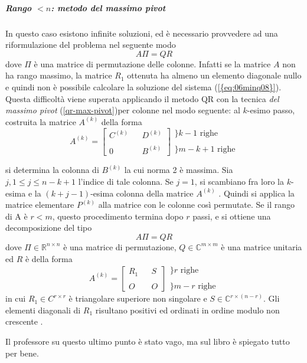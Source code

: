 \subparagraph{Rango $<n$: metodo del massimo pivot} 
In questo caso esistono infinite soluzioni, ed \`e necessario
provvedere ad una riformulazione del problema nel seguente modo
$$ A\Pi = QR$$ 
dove $\Pi$ \`e una matrice di permutazione delle colonne.  Infatti se
la matrice $A$ non ha rango massimo, la matrice $R_1$ ottenuta ha
almeno un elemento diagonale nullo e quindi non \`e possibile
calcolare la soluzione del sistema (\ref{{eq:06minq08}}). \\
Questa difficolt\`a viene superata applicando il metodo QR con la
tecnica \emph{del massimo pivot} (\ref{qr-max-pivot})per colonne nel
modo seguente: al $k$-esimo passo, costruita la matrice $A^{(k)}$
della forma
$$
A^{(k)} = \left[
  \begin{array}{lll} 
    C^{(k)} &  & D^{(k)}                                  \\ 
            &  &                                          \\ 0 &  & B^{(k)}
  \end{array} 
\right]
\begin{array}{l} 
  \} k-1 \text{ righe}                                    \\ 
                                                          \\ 
  \}m-k+1 \text{ righe}
\end{array}
$$

si determina la colonna di $B^{(k)}$ la cui norma 2 \`e massima. Sia
$j, 1 \leq j \leq n-k+1$ l'indice di tale colonna. Se $j = 1$, si
scambiano fra loro la $k$-esima e la $(k + j − 1)$-esima colonna della
matrice $A^{(k)}$ . Quindi si applica la matrice elementare $P^{(k)}$
alla matrice con le colonne cos\`i permutate.  Se il rango di A \`e $r
< m$, questo procedimento termina dopo $r$ passi, e si ottiene una
decomposizione del tipo
$$ A\Pi = QR$$ 
dove $\Pi \in \mathbb{R}^{n \times n}$ \`e una matrice di
permutazione, $Q \in \mathbb{C}^{m \times m}$ \`e una matrice unitaria
ed $R$ \`e della forma
$$
 A^{(k)} = \left[
\begin{array}{lll} R_1 & & S \\ & & \\ O & & O
\end{array} \right]
\begin{array}{l} \} r \text{ righe} \\ \\ \}m-r \text{ righe}
\end{array}
$$
in cui $R_1 \in C^{r \times r}$ \`e triangolare superiore non
singolare e $S \in \mathbb{C}^{r \times (n -r)}$. Gli elementi
diagonali di $R_1$ risultano positivi ed ordinati in ordine modulo non
crescente .
\begin{notes} Il professore su questo ultimo punto \`e stato vago, ma
sul libro \`e spiegato tutto per bene.
\end{notes}

